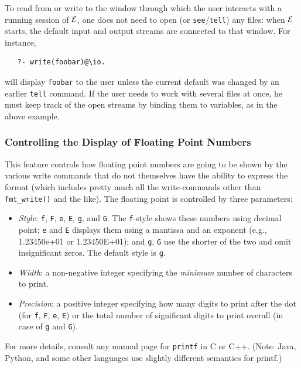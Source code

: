 \documentclass[11pt]{article}
\newcommand{\ERGO}{\mbox{\ensuremath{\cal{E}}\smaller{{\sc{RGO}}}}\xspace}
\newcommand{\FLSYSTEM}{\ERGO}
\begin{document}
To read from or write to the window through which the user interacts with a running
session of \FLSYSTEM, one does not need to open (or
\texttt{see}/\texttt{tell}) any files: when \FLSYSTEM starts, the default
input and output streams are connected to that window. For instance,
\begin{verbatim}
   ?- write(foobar)@\io.
\end{verbatim}
will display \texttt{foobar}  to the user unless the current default was
changed by an earlier \texttt{tell}  command. If the user needs to work
with several files at once, he must keep track of the open streams by
binding them to variables, as in the above example.

\subsubsection{Controlling the Display of Floating Point Numbers}

This feature controls 
how floating point numbers are going to be shown by the various write
commands that do not themselves have the ability to express the format
(which includes pretty much all the write-commands other than
\texttt{fmt\_write()} and the like).
The floating point is controlled by three parameters:
\begin{itemize}
\item  \emph{Style}: \texttt{f}, \texttt{F}, \texttt{e}, \texttt{E},
  \texttt{g}, and \texttt{G}. The \texttt{f}-style shows these numbers
  using decimal point; \texttt{e} and \texttt{E} displays them using a
  mantissa and an exponent (e.g., 1.23450e+01 or 1.23450E+01); and
  \texttt{g}, \texttt{G} use the shorter of the two and omit insignificant
  zeros.  
  The default style is \texttt{g}.
\item \emph{Width}: a non-negative integer specifying the \emph{minimum}  number of
  characters to print.
\item \emph{Precision}: a positive integer specifying how many digits to print after
  the dot (for \texttt{f}, \texttt{F}, \texttt{e}, \texttt{E}) or the total
  number of significant digits to print overall (in case of \texttt{g} and
  \texttt{G}).
\end{itemize}
For more details, consult any manual page for \texttt{printf} in C or C++.
(Note: Java, Python, and some other languages use slightly different
semantics for printf.)
\end{document}
